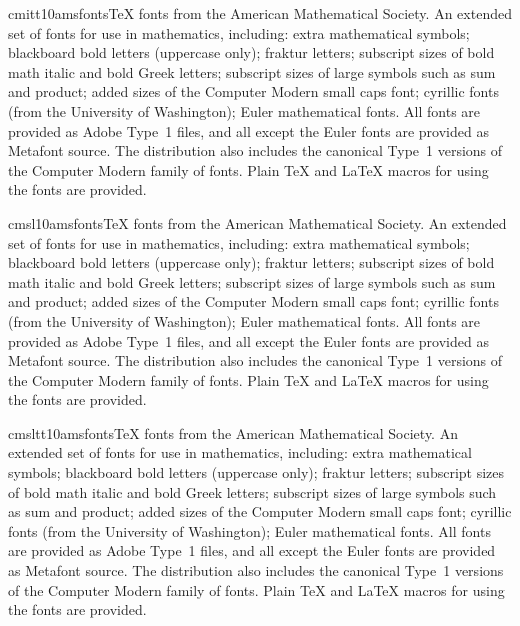 \documentclass{ddltxtyp}
\begin{document}
\begin{package}{cmitt10}{amsfonts}{{\TeX} fonts from the American Mathematical Society.}
An extended set of fonts for use in mathematics, including:
extra mathematical symbols; blackboard bold letters (uppercase
only); fraktur letters; subscript sizes of bold math italic and
bold Greek letters; subscript sizes of large symbols such as
sum and product; added sizes of the Computer Modern small caps
font; cyrillic fonts (from the University of Washington); Euler
mathematical fonts. All fonts are provided as Adobe Type~1
files, and all except the Euler fonts are provided as Metafont
source. The distribution also includes the canonical Type~1
versions of the Computer Modern family of fonts. Plain {\TeX} and
{\LaTeX} macros for using the fonts are provided.
\end{package}
\begin{package}{cmsl10}{amsfonts}{{\TeX} fonts from the American Mathematical Society.}
An extended set of fonts for use in mathematics, including:
extra mathematical symbols; blackboard bold letters (uppercase
only); fraktur letters; subscript sizes of bold math italic and
bold Greek letters; subscript sizes of large symbols such as
sum and product; added sizes of the Computer Modern small caps
font; cyrillic fonts (from the University of Washington); Euler
mathematical fonts. All fonts are provided as Adobe Type~1
files, and all except the Euler fonts are provided as Metafont
source. The distribution also includes the canonical Type~1
versions of the Computer Modern family of fonts. Plain {\TeX} and
{\LaTeX} macros for using the fonts are provided.
\end{package}
\begin{package}{cmsltt10}{amsfonts}{{\TeX} fonts from the American Mathematical Society.}
An extended set of fonts for use in mathematics, including:
extra mathematical symbols; blackboard bold letters (uppercase
only); fraktur letters; subscript sizes of bold math italic and
bold Greek letters; subscript sizes of large symbols such as
sum and product; added sizes of the Computer Modern small caps
font; cyrillic fonts (from the University of Washington); Euler
mathematical fonts. All fonts are provided as Adobe Type~1
files, and all except the Euler fonts are provided as Metafont
source. The distribution also includes the canonical Type~1
versions of the Computer Modern family of fonts. Plain {\TeX} and
{\LaTeX} macros for using the fonts are provided.
\end{package}
\end{document}
